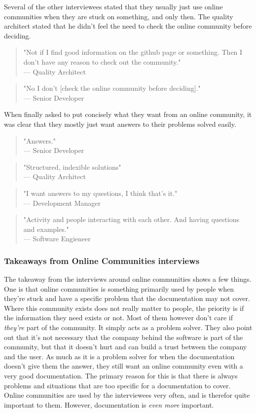 \documentclass{cslthse-msc}
\begin{document}
    Several of the other interviewees stated that they usually just use online communities when they are stuck on something, and only then. The quality architect stated that he didn't feel the need to check the online community before deciding.
    \begin{quote}
        "Not if I find good information on the github page or something. Then I don't have any reason to check out the community."\\--- Quality Architect
    \end{quote}
    \begin{quote}
        "No I don't [check the online community before deciding]." \\--- Senior Developer
    \end{quote}
    When finally asked to put concisely what they want from an online community, it was clear that they mostly just want answers to their problems solved easily.
    \begin{quote}
        "Answers."\\
        --- Senior Developer
    \end{quote}
    \begin{quote}
        "Structured, indexible solutions"\\ --- Quality Architect
    \end{quote}
    \begin{quote}
        "I want answers to my questions, I think that's it." \\ --- Development Manager
    \end{quote}
    \begin{quote}
        "Activity and people interacting with each other. And having questions and examples."\\--- Software Engieneer
    \end{quote}
    \subsubsection{Takeaways from Online Communities interviews}
    The takeaway from the interviews around online communities shows a few things. One is that online communities is something primarily used by people when they're stuck and have a specific problem that the documentation may not cover. Where this community exists does not really matter to people, the priority is if the information they need exists or not. Most of them however don't care if \textit{they're} part of the community. It simply acts as a problem solver. They also point out that it's not necessary that the company behind the software is part of the community, but that it doesn't hurt and can build a trust between the company and the user. As much as it is a problem solver for when the documentation doesn't give them the answer, they still want an online community even with a very good documentation. The primary reason for this is that there is always problems and situations that are too specific for a documentation to cover. Online communities are used by the interviewees very often, and is therefor quite important to them. However, documentation is \textit{even more} important.
\end{document}
